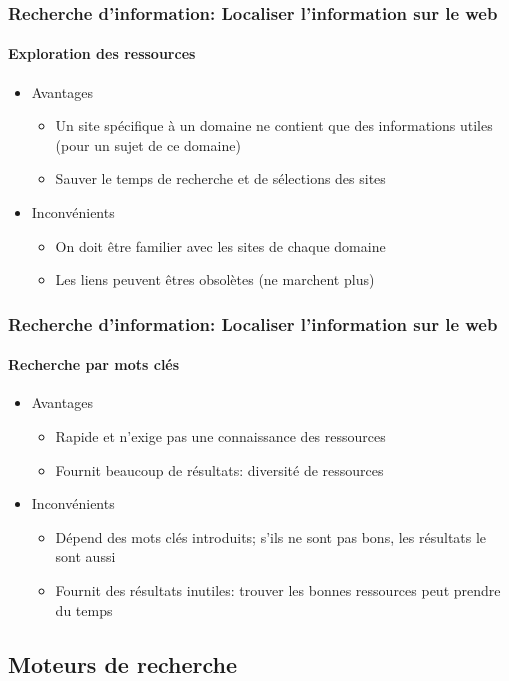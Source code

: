 \documentclass[xcolor=table]{beamer}
\begin{document}
\begin{frame}
\frametitle{Recherche d'information: Localiser l'information sur le web}
\framesubtitle{Exploration des ressources}

\begin{itemize}
	\item Avantages
	\begin{itemize}
		\item Un site spécifique à un domaine ne contient que des informations utiles (pour un sujet de ce domaine) 
		\item Sauver le temps de recherche et de sélections des sites 
	\end{itemize}
	\item Inconvénients
	\begin{itemize}
		\item On doit être familier avec les sites de chaque domaine 
		\item Les liens peuvent êtres obsolètes (ne marchent plus)
	\end{itemize}
\end{itemize} 

\end{frame}


\begin{frame}
\frametitle{Recherche d'information: Localiser l'information sur le web}
\framesubtitle{Recherche par mots clés}

\begin{itemize}
	\item Avantages
	\begin{itemize}
		\item Rapide et n'exige pas une connaissance des ressources
		\item Fournit beaucoup de résultats: diversité de ressources
	\end{itemize}
	\item Inconvénients
	\begin{itemize}
		\item Dépend des mots clés introduits; s'ils ne sont pas bons, les résultats le sont aussi
		\item Fournit des résultats inutiles: trouver les bonnes ressources peut prendre du temps
	\end{itemize}
\end{itemize} 

\end{frame}


\subsection{Moteurs de recherche}
\end{document}
